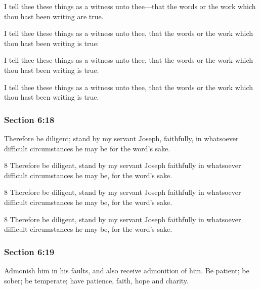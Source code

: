 		I tell thee these things as a witness unto thee---that the words or the work which thou hast been writing are true.

		\begin{framed}
		\scriptsize
			\begin{compactdesc}
				\item[JSP] I tell thee these things as a witness unto thee, that the words or the work which thou hast been writing is true:
				\item[DC 1835] I tell thee these things as a witness unto thee, that the words or the work which thou hast been writing is true.
				\item[DC 1844] I tell thee these things as a witness unto thee, that the words or the work which thou hast been writing is true.
			\end{compactdesc}
		\end{framed}

	\subsubsection{Section 6:18} %
		\label{DC6-18}

		Therefore be diligent; stand by my servant Joseph, faithfully, in whatsoever difficult circumstances he may be for the word's sake.

		\begin{framed}
		\scriptsize
			\begin{compactdesc}
				\item[JSP] 8 Therefore be diligent, stand by my servant Joseph faithfully in whatsoever difficult circumstances he may be, for the word's sake.
				\item[DC 1835] 8 Therefore be diligent, stand by my servant Joseph faithfully in whatsoever difficult circumstances he may be, for the word's sake. 
				\item[DC 1844] 8 Therefore be diligent, stand by my servant Joseph faithfully in whatsoever difficult circumstances he may be, for the word's sake.
			\end{compactdesc}
		\end{framed}

	\subsubsection{Section 6:19} %
		\label{DC6-19}

		Admonish him in his faults, and also receive admonition of him. Be patient; be sober; be temperate; have patience, faith, hope and charity.

